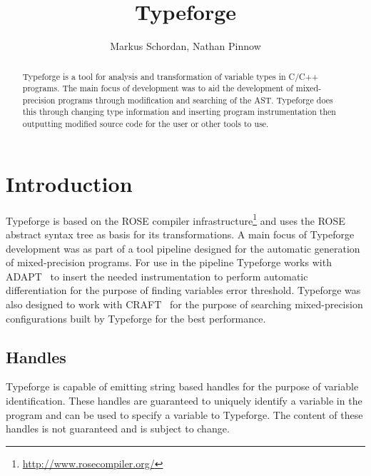 \documentclass[natbib]{article}
\begin{document}
\title{Typeforge}

\author{\small Markus Schordan, Nathan Pinnow}

\maketitle

\begin{abstract}
\noindent Typeforge is a tool for analysis and transformation of variable types in 
C/C++ programs. The main focus of development was to aid the development of 
mixed-precision programs through modification and searching of the AST. 
Typeforge does this through changing type information and inserting program 
instrumentation then outputting modified source code for the user or other tools to use.

\end{abstract}

\tableofcontents


\section{Introduction}
\label{sec:intro}

Typeforge is based on the ROSE compiler infrastructure\footnote{\url{http://www.rosecompiler.org/}} 
and uses the ROSE abstract syntax tree as basis for its transformations. 
A main focus of Typeforge development was as part of a tool pipeline designed for 
the automatic generation of mixed-precision programs. For use in the pipeline 
Typeforge works with ADAPT~\cite{adapt} to insert the needed instrumentation to 
perform automatic differentiation for the purpose of finding variables error threshold.
Typeforge was also designed to work with CRAFT~\cite{CRAFT2013PARCO,CRAFT2013ICS,CRAFT2016} 
for the purpose of searching mixed-precision configurations built by Typeforge 
for the best performance.

\subsection{Handles}
Typeforge is capable of emitting string based handles for the purpose of variable identification. 
These handles are guaranteed to uniquely identify a variable in the program and can be used to 
specify a variable to Typeforge. The content of these handles is not guaranteed and is 
subject to change.
\end{document}

